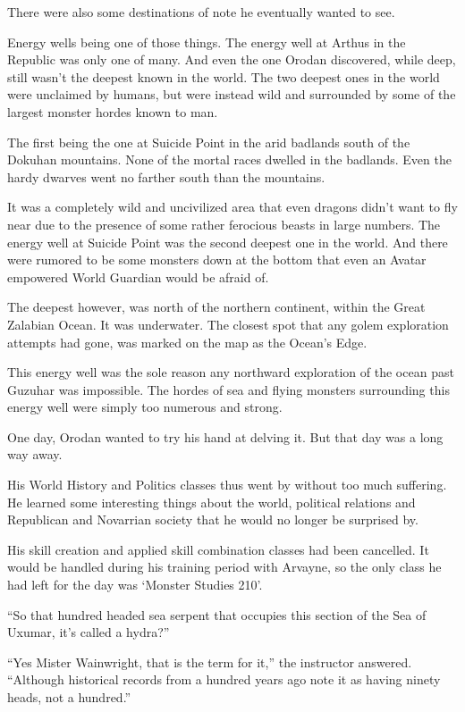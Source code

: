 \documentclass[a4paper,10pt]{book}
\begin{document}
There were also some destinations of note he eventually wanted to see.\par
Energy wells being one of those things. The energy well at Arthus in the Republic was only one of many. And even the one Orodan discovered, while deep, still wasn’t the deepest known in the world. The two deepest ones in the world were unclaimed by humans, but were instead wild and surrounded by some of the largest monster hordes known to man.\par
The first being the one at Suicide Point in the arid badlands south of the Dokuhan mountains. None of the mortal races dwelled in the badlands. Even the hardy dwarves went no farther south than the mountains.\par
It was a completely wild and uncivilized area that even dragons didn’t want to fly near due to the presence of some rather ferocious beasts in large numbers. The energy well at Suicide Point was the second deepest one in the world. And there were rumored to be some monsters down at the bottom that even an Avatar empowered World Guardian would be afraid of.\par
The deepest however, was north of the northern continent, within the Great Zalabian Ocean. It was underwater. The closest spot that any golem exploration attempts had gone, was marked on the map as the Ocean’s Edge.\par
This energy well was the sole reason any northward exploration of the ocean past Guzuhar was impossible. The hordes of sea and flying monsters surrounding this energy well were simply too numerous and strong.\par
One day, Orodan wanted to try his hand at delving it. But that day was a long way away.\par
His World History and Politics classes thus went by without too much suffering. He learned some interesting things about the world, political relations and Republican and Novarrian society that he would no longer be surprised by.\par
His skill creation and applied skill combination classes had been cancelled. It would be handled during his training period with Arvayne, so the only class he had left for the day was ‘Monster Studies 210’.\par
\par
“So that hundred headed sea serpent that occupies this section of the Sea of Uxumar, it’s called a hydra?”\par
“Yes Mister Wainwright, that is the term for it,” the instructor answered. “Although historical records from a hundred years ago note it as having ninety heads, not a hundred.”\par
\end{document}
